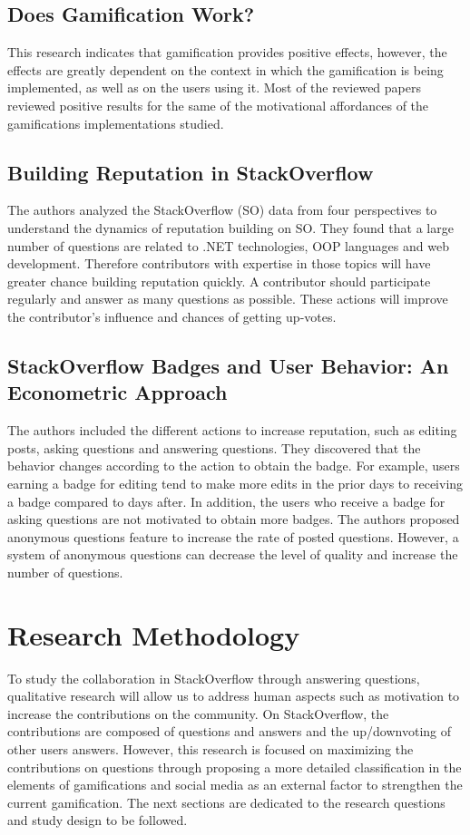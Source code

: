 \documentclass{sigchi}
\begin{document}
\subsection{Does Gamification Work?}

This research indicates that gamification provides positive effects, however,
the effects are greatly dependent on the context in which the gamification is
being implemented, as well as on the users using it. Most of the reviewed
papers reviewed positive results for the same of the motivational affordances
of the gamifications implementations studied.

\subsection{Building Reputation in StackOverflow}

The authors analyzed the StackOverflow (SO) data from four perspectives to
understand the dynamics of reputation building on SO. They found that a large
number of questions are related to .NET technologies, OOP languages and web
development. Therefore contributors with expertise in those topics will have
greater chance building reputation quickly. A contributor should participate
regularly and answer as many questions as possible. These actions will improve
the contributor’s influence and chances of getting up-votes.

\subsection{StackOverflow Badges and User Behavior: An Econometric Approach}

The authors included the different actions to increase reputation, such as
editing posts, asking questions and answering questions. They discovered that
the behavior changes according to the action to obtain the badge. For example,
users earning a badge for editing tend to make more edits in the prior days to
receiving a badge compared to days after. In addition, the users who receive a
badge for asking questions are not motivated to obtain more badges. The authors
proposed anonymous questions feature to increase the rate of posted questions.
However, a system of anonymous questions can decrease the level of quality and
increase the number of questions.


\section{Research Methodology}
To study the collaboration in StackOverflow through answering questions,
qualitative research will allow us to address human aspects such as motivation
to increase the contributions on the community. On StackOverflow, the
contributions are composed of questions and answers and the up/downvoting of other users answers. However, this research is
focused on maximizing the contributions on questions through proposing a more
detailed classification in the elements of gamifications and social media as an
external factor to strengthen the current gamification. The next sections are
dedicated to the research questions and study design to be followed.
\end{document}
